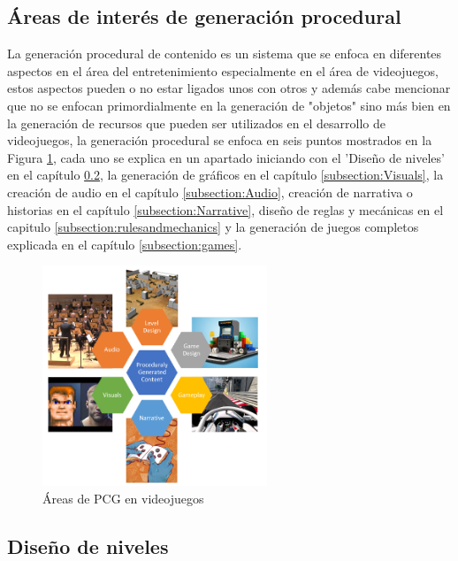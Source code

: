 \subsection{Áreas de interés de generación procedural}
\label{subsection:PCGAreasOfInterest}

La generación procedural de contenido es un sistema que se enfoca en diferentes
aspectos en el área del entretenimiento especialmente en el área de videojuegos,
estos aspectos pueden o no estar ligados unos con otros y además cabe mencionar
que no se enfocan primordialmente en la generación de "objetos" sino más bien en
la generación de recursos que pueden ser utilizados en el desarrollo de
videojuegos, la generación procedural se enfoca en seis puntos mostrados en la
Figura \ref{figure:pcg_areas}, cada uno se explica en un apartado iniciando con
el 'Diseño de niveles' en el capítulo \ref{subsection:LevelDesign}, la
generación de gráficos en el capítulo \ref{subsection:Visuals}, la creación de
audio en el capítulo \ref{subsection:Audio}, creación de narrativa o historias
en el capítulo \ref{subsection:Narrative}, diseño de reglas y mecánicas en el
capitulo \ref{subsection:rulesandmechanics} y la generación de juegos completos
explicada en el capítulo \ref{subsection:games}.

\begin{figure}
    \centering
    \includegraphics[width=0.6\textwidth]{img/pcg_areas.png}
    \caption{Áreas de PCG en videojuegos}
    \label{figure:pcg_areas}
\end{figure}

\subsection{Diseño de niveles}
\label{subsection:LevelDesign}

